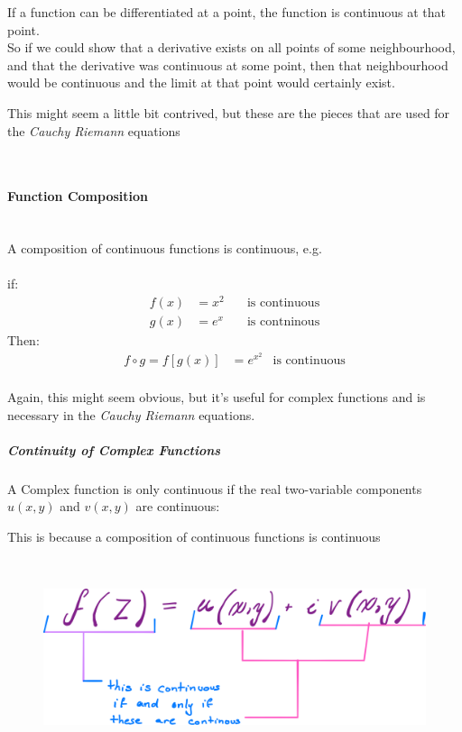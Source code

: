 \documentclass[class=article, crop=false]{standalone}
\begin{document}
If a function can be differentiated at a point, the function is continuous at that point. \\

So if we could show that a derivative exists on all points of some neighbourhood, and that the derivative was continuous at some point, then that neighbourhood would be continuous and the limit at that point would certainly exist. \\

\hfill\begin{minipage}{\dimexpr\textwidth-3cm}
This might seem a little bit contrived, but these are the pieces that are used for the \textit{Cauchy Riemann} equations 
\end{minipage}
\ \


\newpage


\paragraph{Function Composition}\ \\
A composition of continuous functions is continuous, e.g. \ \\
\ \\
if:
\begin{align*}
  f \left( x \right) &= x^2 \quad &\text{is continuous} \\
  g \left( x \right) &= e^x \quad &\text{is contninous}
\end{align*}
Then:
\begin{align*}
  f \circ g =  f \left[  g \left( x \right)  \right]  &=  e^{x^{2}} &\text{is continuous}
\end{align*}
\ \\
Again, this might seem obvious, but it's useful for complex functions and is necessary in the \textit{Cauchy Riemann} equations.


\subparagraph{Continuity of Complex Functions}
A Complex function is only continuous if the real two-variable components $u \left( x, y \right)$ and $v \left( x,y \right) $ are continuous:\\

\hfill\begin{minipage}{\dimexpr\textwidth-3cm}
  {\footnotesize This is because a composition of continuous functions is continuous}
\end{minipage}
\ \\

\begin{figure}[h!]
	\centering
	\includegraphics[width=0.7\linewidth]{"./media/ComplexFunctions/PNG image 4.png"}
	\label{fig:png-image-4}
\end{figure}
\end{document}
